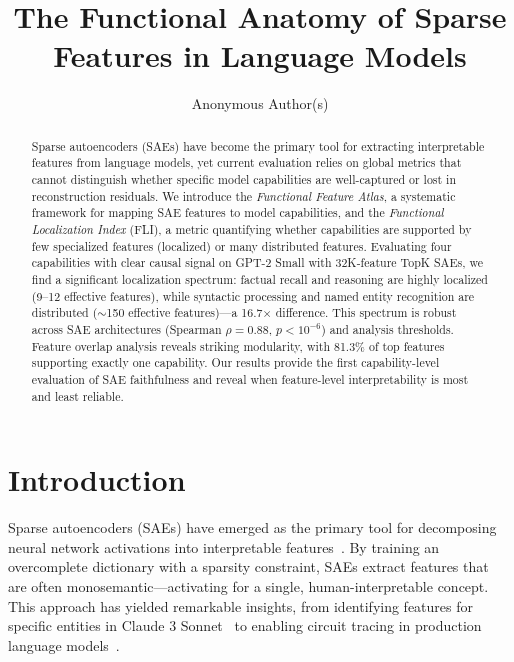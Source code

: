 \documentclass{article}
\title{The Functional Anatomy of Sparse Features in Language Models}
\author{
  Anonymous Author(s)
}
\begin{document}
\maketitle

\begin{abstract}
Sparse autoencoders (SAEs) have become the primary tool for extracting interpretable features from language models, yet current evaluation relies on global metrics that cannot distinguish whether specific model capabilities are well-captured or lost in reconstruction residuals. We introduce the \emph{Functional Feature Atlas}, a systematic framework for mapping SAE features to model capabilities, and the \emph{Functional Localization Index} (FLI), a metric quantifying whether capabilities are supported by few specialized features (localized) or many distributed features. Evaluating four capabilities with clear causal signal on GPT-2 Small with 32K-feature TopK SAEs, we find a significant localization spectrum: factual recall and reasoning are highly localized (9--12 effective features), while syntactic processing and named entity recognition are distributed ($\sim$150 effective features)---a 16.7$\times$ difference. This spectrum is robust across SAE architectures (Spearman $\rho = 0.88$, $p < 10^{-6}$) and analysis thresholds. Feature overlap analysis reveals striking modularity, with 81.3\% of top features supporting exactly one capability. Our results provide the first capability-level evaluation of SAE faithfulness and reveal when feature-level interpretability is most and least reliable.
\end{abstract}

\section{Introduction}

Sparse autoencoders (SAEs) have emerged as the primary tool for decomposing neural network activations into interpretable features~\citep{cunningham2024sparse,bricken2023monosemanticity}. By training an overcomplete dictionary with a sparsity constraint, SAEs extract features that are often monosemantic---activating for a single, human-interpretable concept. This approach has yielded remarkable insights, from identifying features for specific entities in Claude 3 Sonnet~\citep{templeton2024scaling} to enabling circuit tracing in production language models~\citep{lindsey2025circuit}.
\end{document}
